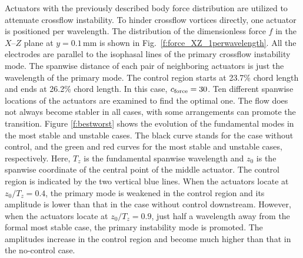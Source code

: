 Actuators with the previously described body force distribution are utilized to attenuate  crossflow instability. To hinder  crossflow vortices directly, one actuator is positioned per wavelength. The distribution of the dimensionless force $f$ in the $X$--$Z$ plane at $y=0.1$\,mm is shown in Fig.~\ref{f:force_XZ_1perwavelength}. All the electrodes are parallel to the isophasal lines of the primary crossflow instability mode. The spanwise distance of each pair of neighboring actuators is just the wavelength of the primary mode. The control region starts at 23.7\% chord length and ends at 26.2\% chord length. In this case,  $c_{\rm force}= 30$. Ten different spanwise locations of the actuators are examined to find the optimal one. The flow does not always become stabler in all cases, with some arrangements can promote the transition. Figure \ref{f:bestworst} shows the evolution of the fundamental modes in the most stable and  unstable cases. The black curve stands for the case without control, and the green and red curves for the most stable and  unstable cases, respectively. Here, $T_z$ is the fundamental spanwise wavelength and $z_0$ is the spanwise coordinate of the central point of the middle actuator. The control region is indicated by the two vertical blue lines. When the actuators locate at $z_0/T_z=0.4$, the primary mode is weakened in the control region and its amplitude is lower than that in the case without control downstream. However, when the actuators locate at $z_0/T_z=0.9$, just half a wavelength away from the formal most stable case, the primary instability mode is promoted. The amplitudes increase in the control region and become much higher than that in the no-control case.

